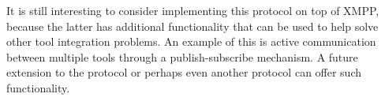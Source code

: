 \documentclass{article}
\begin{document}
   It is still interesting to consider implementing this protocol on top of
   XMPP, because the latter has additional functionality that can be used to
   help solve other tool integration problems. An example of this is active
   communication between multiple tools through a publish-subscribe mechanism.
   A future extension to the protocol or perhaps even another protocol can
   offer such functionality.

  
\end{document}
